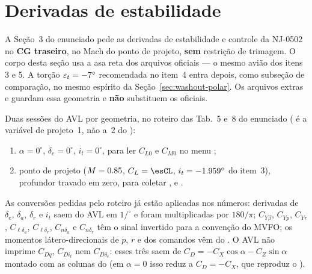 


\section{Derivadas de estabilidade}
\label{sec:estabilidade}

A Seção~3 do enunciado pede as derivadas de estabilidade e controle da NJ-0502
no \textbf{CG traseiro}, no Mach do ponto de projeto, \textbf{sem} restrição de
trimagem. O corpo desta seção usa a asa reta dos arquivos oficiais
 --- o mesmo avião dos itens 3 e 5. A torção
$\varepsilon_t = -7^\circ$ recomendada no item~4 entra depois, como
subseção de comparação, no mesmo espírito da Seção~\ref{sec:washout-polar}.
Os arquivos extras  e  guardam
essa geometria e \textbf{não} substituem os  oficiais.

Duas sessões do AVL por geometria, no roteiro das Tab.~5 e~8 do enunciado
( é a variável de projeto~1, não a~2 do ):

\begin{enumerate}
  \item $\alpha = 0^\circ$, $\delta_e = 0^\circ$, $i_t = 0^\circ$, para ler
  $C_{L0}$ e $C_{M0}$ no menu ;
  \item ponto de projeto ($M = 0.85$, $C_L = \esCL$, $i_t = -1.959^\circ$
  do item~3), profundor travado em zero, para coletar ,  e
  .
\end{enumerate}

As conversões pedidas pelo roteiro já estão aplicadas nos números: derivadas
de $\delta_e$, $\delta_a$, $\delta_r$ e $i_t$ saem do AVL em $1/^\circ$ e foram
multiplicadas por $180/\pi$; $C_{Y\beta}$, $C_{Yp}$, $C_{Yr}$,
$C_{\ell\delta_a}$, $C_{\ell\delta_r}$, $C_{n\delta_a}$ e $C_{n\delta_r}$ têm o
sinal invertido para a convenção do MVFO; os momentos látero-direcionais de
$p$, $r$ e dos comandos vêm do . O AVL não imprime $C_{Dq}$,
$C_{Di_t}$ nem $C_{D\delta_e}$: esses três saem de
$C_D = -C_X\cos\alpha - C_Z\sin\alpha$ montado com as colunas do 
(em $\alpha = 0$ isso reduz a $C_D = -C_X$, que reproduz o ).

